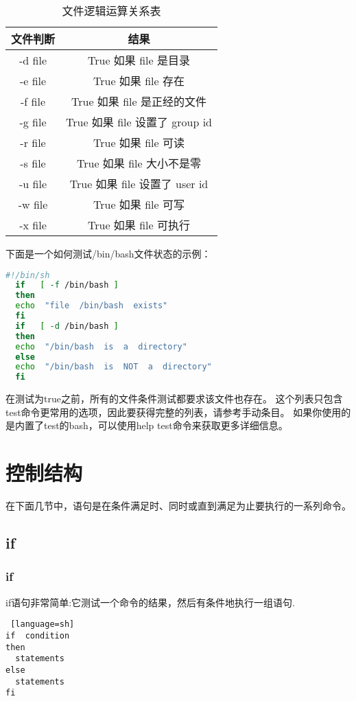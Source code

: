 \documentclass[a4paper]{ctexart}
\begin{document}
\begin{table}[p!]
  \caption{文件逻辑运算关系表}
\centering
\begin{tabular}{|c|c|}
\hline
文件判断 & 结果 \\
\hline
-d file & True 如果 file 是目录\\
\hline
-e file & True 如果 file 存在\\
\hline
-f file & True 如果 file 是正经的文件\\
\hline
-g file & True 如果 file 设置了 group id\\
\hline
-r file & True 如果 file 可读\\
\hline
-s file & True 如果 file 大小不是零\\
\hline
-u file & True 如果 file 设置了 user id\\
\hline
-w file & True 如果 file 可写\\
\hline
-x file & True 如果 file 可执行\\
\hline
\end{tabular}
\end{table}

下面是一个如何测试/bin/bash文件状态的示例：
\begin{lstlisting}[language=sh]
  #!/bin/sh
  if   [ -f /bin/bash ]
  then
  echo  "file  /bin/bash  exists"
  fi
  if   [ -d /bin/bash ]
  then
  echo  "/bin/bash  is  a  directory"
  else
  echo  "/bin/bash  is  NOT  a  directory"
  fi
\end{lstlisting}

在测试为true之前，所有的文件条件测试都要求该文件也存在。
这个列表只包含test命令更常用的选项，因此要获得完整的列表，请参考手动条目。
如果你使用的是内置了test的bash，可以使用help test命令来获取更多详细信息。

\section{控制结构}
在下面几节中，语句是在条件满足时、同时或直到满足为止要执行的一系列命令。
\subsection{if}
\subsubsection{if}
if语句非常简单:它测试一个命令的结果，然后有条件地执行一组语句.
\begin{lstlisting} [language=sh]
if  condition
then
  statements
else
  statements
fi
\end{lstlisting}
\end{document}

